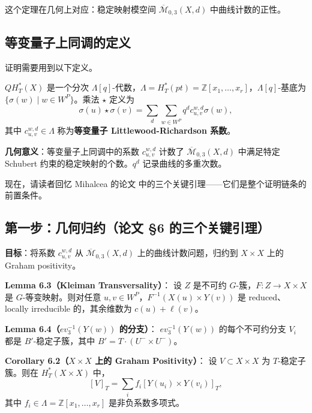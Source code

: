 这个定理在几何上对应：稳定映射模空间 $\overline{\mathcal{M}}_{0,3}(X,d)$ 中曲线计数的正性。

\subsection{等变量子上同调的定义}
\label{sec:EQCDefinitionCh4}

证明需要用到以下定义。

\begin{Definition}
\label{def:EquivariantQuantumCohomologyCh4}
$QH_T^*(X)$ 是一个分次 $\Lambda[q]$-代数，$\Lambda = H_T^*(pt) = \mathbb{Z}[x_1,\ldots,x_r]$，$\Lambda[q]$-基底为 $\{\sigma(w) \mid w \in W^P\}$。乘法 $\star$ 定义为
\begin{equation}
\sigma(u) \star \sigma(v) = \sum_{d} \sum_{w \in W^P} q^d c_{u,v}^{w,d} \sigma(w),
\label{eq:EQCDefinitionCh4}
\end{equation}
其中 $c_{u,v}^{w,d} \in \Lambda$ 称为\textbf{等变量子 Littlewood-Richardson 系数}。
\end{Definition}

\textbf{几何意义}：等变量子上同调中的系数 $c_{u,v}^{w,d}$ 计数了 $\overline{\mathcal{M}}_{0,3}(X,d)$ 中满足特定 Schubert 约束的稳定映射的个数。$q^d$ 记录曲线的多重次数。

现在，请读者回忆 Mihalcea 的论文 \cite[Section 6]{Mihalcea} 中的三个关键引理——它们是整个证明链条的前置条件。

\subsection{第一步：几何归约（论文 \S 6 的三个关键引理）}
\label{sec:KeyLemmasCh4Proof}

\textbf{目标}：将系数 $c_{u,v}^{w,d}$ 从 $\overline{\mathcal{M}}_{0,3}(X,d)$ 上的曲线计数问题，归约到 $X \times X$ 上的 Graham positivity。

\textbf{Lemma 6.3（Kleiman Transversality）}{\cite[Lemma 7.2]{FW}}：
\label{prop:KleimanTransversalityCh4}
设 $Z$ 是不可约 $G$-簇，$F: Z \to X \times X$ 是 $G$-等变映射。则对任意 $u, v \in W^P$，$F^{-1}(X(u) \times Y(v))$ 是 reduced、locally irreducible 的，其余维数为 $c(u) + \ell(v)$。

\textbf{Lemma 6.4（$ev_3^{-1}(Y(w))$ 的分支）}{\cite[Lemma 6.4]{Mihalcea}}：
\label{prop:ev3inverseCh4}
$ev_3^{-1}(Y(w))$ 的每个不可约分支 $V_i$ 都是 $B'$-稳定子簇，其中 $B' = T \cdot (U^- \times U^-)$。

\textbf{Corollary 6.2（$X \times X$ 上的 Graham Positivity）}{\cite[Corollary 6.2]{Mihalcea}}：
\label{cor:GrahamOnXXCh4}
设 $V \subset X \times X$ 为 $T$-稳定子簇。则在 $H_T^*(X \times X)$ 中，
$$[V]_T = \sum_i f_i [Y(u_i) \times Y(v_i)]_T,$$
其中 $f_i \in \Lambda = \mathbb{Z}[x_1,\ldots,x_r]$ 是非负系数多项式。


